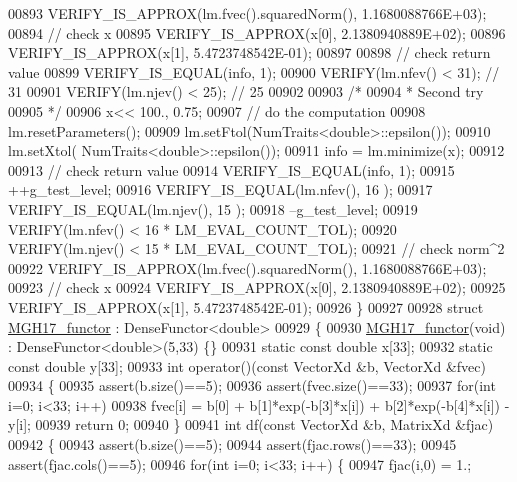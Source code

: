 \begin{DoxyCode}
00893   VERIFY\_IS\_APPROX(lm.fvec().squaredNorm(), 1.1680088766E+03);
00894   \textcolor{comment}{// check x}
00895   VERIFY\_IS\_APPROX(x[0], 2.1380940889E+02);
00896   VERIFY\_IS\_APPROX(x[1], 5.4723748542E-01);
00897   
00898   \textcolor{comment}{// check return value}
00899   VERIFY\_IS\_EQUAL(info, 1);
00900   VERIFY(lm.nfev() < 31); \textcolor{comment}{// 31}
00901   VERIFY(lm.njev() < 25); \textcolor{comment}{// 25}
00902 
00903   \textcolor{comment}{/*}
00904 \textcolor{comment}{   * Second try}
00905 \textcolor{comment}{   */}
00906   x<< 100., 0.75;
00907   \textcolor{comment}{// do the computation}
00908   lm.resetParameters();
00909   lm.setFtol(NumTraits<double>::epsilon());
00910   lm.setXtol( NumTraits<double>::epsilon());
00911   info = lm.minimize(x);
00912 
00913   \textcolor{comment}{// check return value}
00914   VERIFY\_IS\_EQUAL(info, 1); 
00915   ++g\_test\_level;
00916   VERIFY\_IS\_EQUAL(lm.nfev(), 16 );
00917   VERIFY\_IS\_EQUAL(lm.njev(), 15 );
00918   --g\_test\_level;
00919   VERIFY(lm.nfev() < 16 * LM\_EVAL\_COUNT\_TOL);
00920   VERIFY(lm.njev() < 15 * LM\_EVAL\_COUNT\_TOL);
00921   \textcolor{comment}{// check norm^2}
00922   VERIFY\_IS\_APPROX(lm.fvec().squaredNorm(), 1.1680088766E+03);
00923   \textcolor{comment}{// check x}
00924   VERIFY\_IS\_APPROX(x[0], 2.1380940889E+02);
00925   VERIFY\_IS\_APPROX(x[1], 5.4723748542E-01);
00926 \}
00927 
00928 \textcolor{keyword}{struct }\hyperlink{struct_m_g_h17__functor}{MGH17\_functor} : DenseFunctor<double>
00929 \{
00930     \hyperlink{struct_m_g_h17__functor}{MGH17\_functor}(\textcolor{keywordtype}{void}) : DenseFunctor<double>(5,33) \{\}
00931     \textcolor{keyword}{static} \textcolor{keyword}{const} \textcolor{keywordtype}{double} x[33];
00932     \textcolor{keyword}{static} \textcolor{keyword}{const} \textcolor{keywordtype}{double} y[33];
00933     \textcolor{keywordtype}{int} operator()(\textcolor{keyword}{const} VectorXd &b, VectorXd &fvec)
00934     \{
00935         assert(b.size()==5);
00936         assert(fvec.size()==33);
00937         \textcolor{keywordflow}{for}(\textcolor{keywordtype}{int} i=0; i<33; i++)
00938             fvec[i] =  b[0] + b[1]*exp(-b[3]*x[i]) +  b[2]*exp(-b[4]*x[i]) - y[i];
00939         \textcolor{keywordflow}{return} 0;
00940     \}
00941     \textcolor{keywordtype}{int} df(\textcolor{keyword}{const} VectorXd &b, MatrixXd &fjac)
00942     \{
00943         assert(b.size()==5);
00944         assert(fjac.rows()==33);
00945         assert(fjac.cols()==5);
00946         \textcolor{keywordflow}{for}(\textcolor{keywordtype}{int} i=0; i<33; i++) \{
00947             fjac(i,0) = 1.;

\end{DoxyCode}
